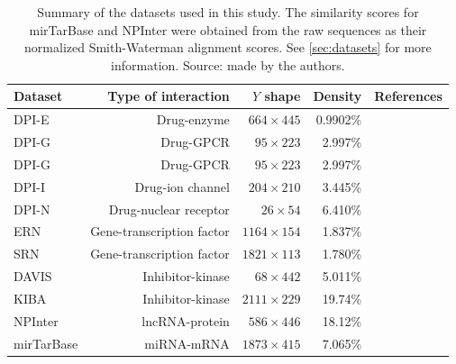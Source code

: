 \begin{table}[tb]
    \centering
    \footnotesize
    \begin{tabular}{lrrrr}
        \toprule
        Dataset & Type of interaction & $Y$ shape & Density & References\\
        \midrule
        DPI-E & Drug-enzyme & $664 \times 445$ & 0.9902\% &\cite{yamanishi2008prediction}\\
        DPI-G & Drug-GPCR & $95 \times 223$ & 2.997\% &\cite{yamanishi2008prediction}\\
        DPI-G & Drug-GPCR & $95 \times 223$ & 2.997\% &\cite{yamanishi2008prediction}\\
        DPI-I & Drug-ion channel & $204 \times 210$ & 3.445\% &\cite{yamanishi2008prediction}\\
        DPI-N & Drug-nuclear receptor & $26 \times 54$ & 6.410\% &\cite{yamanishi2008prediction}\\
        ERN & Gene-transcription factor & $1164 \times 154$ & 1.837\% &\cite{faith2007largescale}\\
        SRN & Gene-transcription factor & $1821 \times 113$ & 1.780\% & \cite{macisaac2006improved, hughes2000functional, hu2007genetic, chua2006identifying, schrynemackers2015classifying}\\
        DAVIS & Inhibitor-kinase & $68 \times 442$ & 5.011\% &\cite{davis2011comprehensive,he2017simboost,huang2020deeppurpose}\\
        KIBA & Inhibitor-kinase & $2111 \times 229$ & 19.74\% &\cite{tang2014making,he2017simboost,huang2020deeppurpose}\\
        NPInter & lncRNA-protein & $586 \times 446$ & 18.12\% &\cite{wu2006npinter, teng2020npinter}\\
        mirTarBase & miRNA-mRNA & $1873 \times 415$ & 7.065\% &\cite{hsu2011mirtarbase, huang2022mirtarbase}\\
        \bottomrule
    \end{tabular}
    \caption{
        Summary of the datasets used in this study. The similarity scores for mirTarBase and NPInter were obtained from the raw sequences as their normalized Smith-Waterman alignment scores. See \autoref{sec:datasets} for more information. Source: made by the authors.
    }
    \label{tab:datasets}
\end{table}


